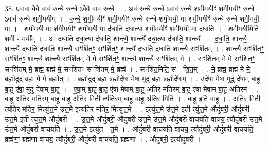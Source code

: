 \documentclass[17pt]{extarticle}
\begin{document}
38. ए॒वावा वै॒वै वाव॑ रुन्धे रु॒न्धे ऽवै॒वै वाव॑ रुन्धे । . अव॑ रुन्धे रु॒न्धे ऽवाव॑ रुन्धे शमी॒मयीꣳ॑ शमी॒मयीꣳ॑ रु॒न्धे ऽवाव॑ रुन्धे शमी॒मयी᳚म् । . रु॒न्धे॒ श॒मी॒मयीꣳ॑ शमी॒मयीꣳ॑ रुन्धे रुन्धे शमी॒मयी॒ मा श॑मी॒मयीꣳ॑ रुन्धे रुन्धे शमी॒मयी॒ मा । . श॒मी॒मयी॒ मा श॑मी॒मयीꣳ॑ शमी॒मयी॒ मा द॑धाति दधा॒त्या श॑मी॒मयीꣳ॑ शमी॒मयी॒ मा द॑धाति । . श॒मी॒मयी॒मिति॑ शमी - मयी᳚म् । . आ द॑धाति दधा॒त्या द॑धाति॒ शान्त्यै॒ शान्त्यै॑ दधा॒त्या द॑धाति॒ शान्त्यै᳚ । . द॒धा॒ति॒ शान्त्यै॒ शान्त्यै॑ दधाति दधाति॒ शान्त्यै॒ सꣳशि॑तꣳ॒॒ सꣳशि॑तꣳ॒॒ शान्त्यै॑ दधाति दधाति॒ शान्त्यै॒ सꣳशि॑तम् । . शान्त्यै॒ सꣳशि॑तꣳ॒॒ सꣳशि॑तꣳ॒॒ शान्त्यै॒ शान्त्यै॒ सꣳशि॑तम् मे मे॒ सꣳशि॑तꣳ॒॒ शान्त्यै॒ शान्त्यै॒ सꣳशि॑तम् मे । . सꣳशि॑तम् मे मे॒ सꣳशि॑तꣳ॒॒ सꣳशि॑तम् मे॒ ब्रह्म॒ ब्रह्म॑ मे॒ सꣳशि॑तꣳ॒॒ सꣳशि॑तम् मे॒ ब्रह्म॑ । . सꣳशि॑त॒मिति॒ सं - शि॒त॒म् । . मे॒ ब्रह्म॒ ब्रह्म॑ मे मे॒ ब्रह्मोदुद् ब्रह्म॑ मे मे॒ ब्रह्मोत् । . ब्रह्मोदुद् ब्रह्म॒ ब्रह्मोदे॑षा मेषा॒ मुद् ब्रह्म॒ ब्रह्मोदे॑षाम् । . उदे॑षा मेषा॒ मुदु दे॑षाम् बा॒हू बा॒हू ए॑षा॒ मुदु दे॑षाम् बा॒हू । . ए॒षा॒म् बा॒हू बा॒हू ए॑षा मेषाम् बा॒हू अ॑तिर मतिरम् बा॒हू ए॑षा मेषाम् बा॒हू अ॑तिरम् । . बा॒हू अ॑तिर मतिरम् बा॒हू बा॒हू अ॑तिर॒ मिती त्य॑तिरम् बा॒हू बा॒हू अ॑तिर॒ मिति॑ । . बा॒हू इति॑ बा॒हू । . अ॒ति॒र॒ मिती त्य॑तिर मतिर॒ मित्यु॑त्त॒मे उ॑त्त॒मे इत्य॑तिर मतिर॒ मित्यु॑त्त॒मे । . इत्यु॑त्त॒मे उ॑त्त॒मे इती त्यु॑त्त॒मे औदुं॑बरी॒ औदुं॑बरी उत्त॒मे इती त्यु॑त्त॒मे औदुं॑बरी । . उ॒त्त॒मे औदुं॑बरी॒ औदुं॑बरी उत्त॒मे उ॑त्त॒मे औदुं॑बरी वाचयति वाचय॒ त्यौदुं॑बरी उत्त॒मे उ॑त्त॒मे औदुं॑बरी वाचयति । . उ॒त्त॒मे इत्यु॑त् - त॒मे । . औदुं॑बरी वाचयति वाचय॒ त्यौदुं॑बरी॒ औदुं॑बरी वाचयति॒ ब्रह्म॑णा॒ ब्रह्म॑णा वाचय॒ त्यौदुं॑बरी॒ औदुं॑बरी वाचयति॒ ब्रह्म॑णा । . औदुं॑बरी॒ इत्यौदुं॑बरी । \newline
\pagebreak
{}
\end{document}
